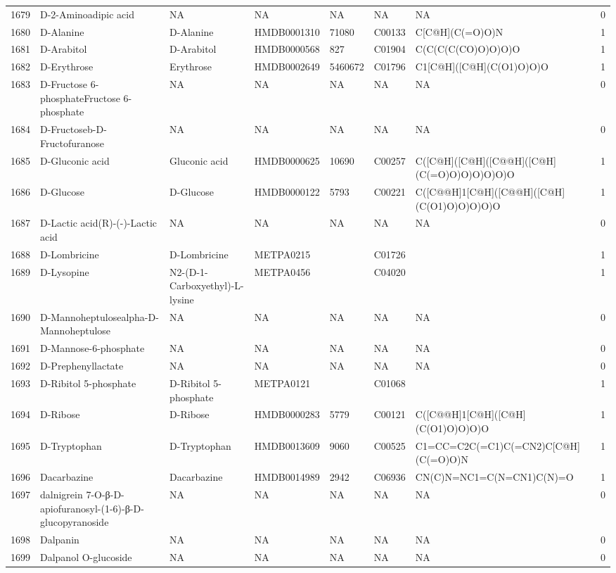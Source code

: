 \documentclass[a4paper]{article}
\begin{document}
\begin{longtable}{rlllllll}
  1679 & D-2-Aminoadipic acid & NA & NA & NA & NA & NA & 0 \\ 
  1680 & D-Alanine & D-Alanine & HMDB0001310 & 71080 & C00133 & C[C@H](C(=O)O)N & 1 \\ 
  1681 & D-Arabitol & D-Arabitol & HMDB0000568 & 827 & C01904 & C(C(C(C(CO)O)O)O)O & 1 \\ 
  1682 & D-Erythrose & Erythrose & HMDB0002649 & 5460672 & C01796 & C1[C@H]([C@H](C(O1)O)O)O & 1 \\ 
  1683 & D-Fructose 6-phosphateFructose 6-phosphate & NA & NA & NA & NA & NA & 0 \\ 
  1684 & D-Fructoseb-D-Fructofuranose & NA & NA & NA & NA & NA & 0 \\ 
  1685 & D-Gluconic acid & Gluconic acid & HMDB0000625 & 10690 & C00257 & C([C@H]([C@H]([C@@H]([C@H](C(=O)O)O)O)O)O)O & 1 \\ 
  1686 & D-Glucose & D-Glucose & HMDB0000122 & 5793 & C00221 & C([C@@H]1[C@H]([C@@H]([C@H](C(O1)O)O)O)O)O & 1 \\ 
  1687 & D-Lactic acid(R)-(-)-Lactic acid & NA & NA & NA & NA & NA & 0 \\ 
  1688 & D-Lombricine & D-Lombricine & METPA0215 &  & C01726 &  & 1 \\ 
  1689 & D-Lysopine & N2-(D-1-Carboxyethyl)-L-lysine & METPA0456 &  & C04020 &  & 1 \\ 
  1690 & D-Mannoheptulosealpha-D-Mannoheptulose & NA & NA & NA & NA & NA & 0 \\ 
  1691 & D-Mannose-6-phosphate & NA & NA & NA & NA & NA & 0 \\ 
  1692 & D-Prephenyllactate & NA & NA & NA & NA & NA & 0 \\ 
  1693 & D-Ribitol 5-phosphate & D-Ribitol 5-phosphate & METPA0121 &  & C01068 &  & 1 \\ 
  1694 & D-Ribose & D-Ribose & HMDB0000283 & 5779 & C00121 & C([C@@H]1[C@H]([C@H](C(O1)O)O)O)O & 1 \\ 
  1695 & D-Tryptophan & D-Tryptophan & HMDB0013609 & 9060 & C00525 & C1=CC=C2C(=C1)C(=CN2)C[C@H](C(=O)O)N & 1 \\ 
  1696 & Dacarbazine & Dacarbazine & HMDB0014989 & 2942 & C06936 & CN(C)N=NC1=C(N=CN1)C(N)=O & 1 \\ 
  1697 & dalnigrein 7-O-β-D-apiofuranosyl-(1-6)-β-D-glucopyranoside & NA & NA & NA & NA & NA & 0 \\ 
  1698 & Dalpanin & NA & NA & NA & NA & NA & 0 \\ 
  1699 & Dalpanol O-glucoside & NA & NA & NA & NA & NA & 0 \\ 

\end{longtable}
\end{document}
